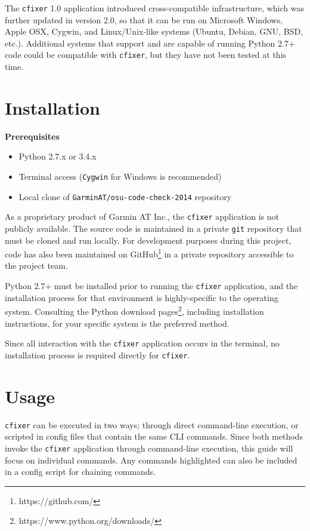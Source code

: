 \documentclass[11pt]{scrreprt}
\begin{document}
The \texttt{cfixer} 1.0 application introduced cross-compatible infrastructure, which was further updated in version 2.0, so that it can be run on Microsoft Windows, Apple OSX, Cygwin, and Linux/Unix-like systems (Ubuntu, Debian, GNU, BSD, etc.).
Additional systems that support and are capable of running Python 2.7+ code could be compatible with \texttt{cfixer}, but they have not been tested at this time.

\section{Installation}

\textbf{Prerequisites}
\begin{itemize}
	\item Python 2.7.x or 3.4.x
	\item Terminal access (\texttt{Cygwin} for Windows is recommended)
	\item Local clone of \texttt{GarminAT/osu-code-check-2014} repository
\end{itemize}

As a proprietary product of Garmin AT Inc., the \texttt{cfixer} application is not publicly available.
The source code is maintained in a private \texttt{git} repository that must be cloned and run locally.
For development purposes during this project, code has also been maintained on GitHub\footnote{https://github.com/} in a private repository accessible to the project team.

Python 2.7+ must be installed prior to running the \texttt{cfixer} application, and the installation process for that environment is highly-specific to the operating system. Consulting the Python download pages\footnote{https://www.python.org/downloads/}, including installation instructions, for your specific system is the preferred method.

Since all interaction with the \texttt{cfixer} application occurs in the terminal, no installation process is required directly for \texttt{cfixer}.

\section{Usage}

\texttt{cfixer} can be executed in two ways; through direct command-line execution, or scripted in config files that contain the same CLI commands.
Since both methods invoke the \texttt{cfixer} application through command-line execution, this guide will focus on individual commands.
Any commands highlighted can also be included in a config script for chaining commands.
\end{document}
